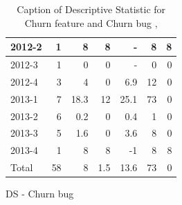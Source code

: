 \documentclass[UKenglish]{ifimaster}  %
\begin{document}
\begin{appendices}
\begin{table}[!htbp]
\begin{adjustwidth}{-2.5cm}{}
\begin{subfigure}[b]{0.3\textwidth}
{\begin{tabular}{ | l | r | r | r | r | r | r | }
 2012-2  & 1 & 8 & 8 & - & 8 & 8 \\ \hline
 2012-3  & 1 & 0 &0 &- & 0 &0\\ \hline
 2012-4  & 3 & 4 & 0 &6.9 & 12 & 0\\ \hline
 2013-1  & 7 & 18.3 & 12 & 25.1 & 73 & 0\\ \hline
 2013-2  & 6 & 0.2 & 0 &0.4 & 1 & 0\\ \hline
 2013-3  & 5 & 1.6 & 0 &3.6 & 8 & 0\\ \hline
 2013-4  & 1 & 8 & 8 & -1 & 8 & 8 \\ \hline
 Total  & 58 & 8 & 1.5 & 13.6 & 73 & 0\\ \hline
\end{tabular}
}
\caption{DS - Churn bug}
 \label{DS:CB:8}
\end{subfigure}
\end{adjustwidth}
\caption[Optional caption for list of figures]{Caption of Descriptive Statistic for Churn feature and Churn bug  , }
\label{DS:8:4} %
\end{table}




\end{appendices}
\end{document}
